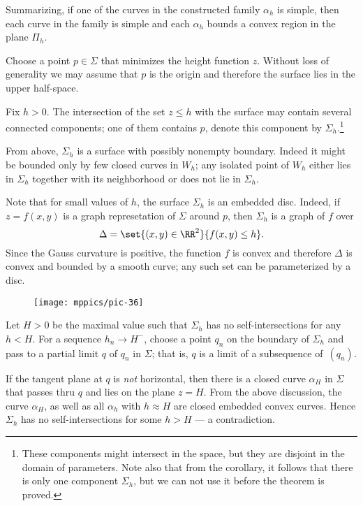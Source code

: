 Summarizing, if one of the curves in the constructed family $\alpha_{h}$ is simple,
then each curve in the family is simple and each $\alpha_{h}$ bounds a convex region in the plane $\Pi_h$. 

Choose a point $p\in \Sigma$ that minimizes the height function $z$.
Without loss of generality we may assume that $p$ is the origin and therefore the surface lies in the upper half-space.

Fix $h>0$.
The intersection of the set $z\le h$ with the surface may contain several connected components;
one of them contains $p$, denote this component by $\Sigma_h$.\footnote{These components might intersect in the space, but they are disjoint in the domain of parameters. Note also that from the corollary, it follows that there is only one component $\Sigma_h$, but we can not use it before the theorem is proved.}


From above, $\Sigma_h$ is a surface with possibly nonempty boundary.
Indeed it might be bounded only by few closed curves in $W_h$;
any isolated point of $W_h$ either lies in $\Sigma_h$ together with its neighborhood or does not lie in $\Sigma_h$.


Note that for small values of $h$, the surface $\Sigma_h$ is an embedded disc.
Indeed, if $z=f(x,y)$ is a graph represetation of $\Sigma$ around $p$,
then $\Sigma_h$ is a graph of $f$ over 
\[\Delta=\set{(x,y)\in\RR^2}{f(x,y)\le h}.\]
Since the Gauss curvature is positive, the function $f$ is convex and therefore $\Delta$ is convex and bounded by a smooth curve;
any such set can be parameterized by a disc.

\begin{wrapfigure}{o}{30 mm}
\vskip-0mm
\centering
\texttt{[image: mppics/pic-36]}
\vskip-0mm
\end{wrapfigure}

Let $H>0$ be the maximal value such that $\Sigma_h$ has no self-intersections for any $h<H$.
For a sequence $h_n\to H^-$, choose a point $q_n$ on the boundary of $\Sigma_h$ and pass to a partial limit $q$ of $q_n$ in $\Sigma$;
that is, $q$ is a limit of a subsequence of~$(q_n)$.

If the tangent plane at $q$ is {}\emph{not} horizontal, 
then there is a closed curve $\alpha_H$ in $\Sigma$ that passes thru $q$ and lies on the plane $z=H$.
From the above discussion, the curve $\alpha_H$, as well as all $\alpha_h$ with $h\approx H$ are closed embedded convex curves.
Hence $\Sigma_h$ has no self-intersections for some $h>H$ --- a contradiction.

